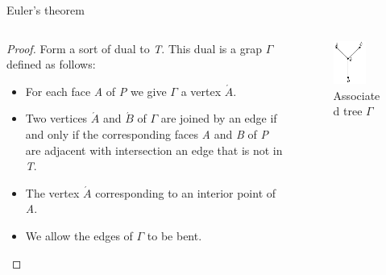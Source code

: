 \documentclass{beamer}
\begin{document}
\begin{frame}{Euler's theorem}
\begin{columns}
\begin{column}{0.6\textwidth}
  \begin{proof}
    Form a sort of dual to \textsl{T}. This dual is a grap $\Gamma$ defined as follows:
    \begin{itemize}
    \item For each face \textsl{A} of \textsl{P} we give $\Gamma$ a vertex $\acute{A}$.
    \item Two vertices $\acute{A}$ and $\acute{B}$ of $\Gamma$ are joined by an edge if and only if the corresponding faces \textsl{A} and \textsl{B} of \textsl{P} are adjacent with intersection an edge that is not in \textsl{T}.
    \item The vertex $\acute{A}$ corresponding to an interior point of \textsl{A}.
    \item We allow the edges of $\Gamma$ to be bent.
    \end{itemize}
  \end{proof}
\end{column}
\begin{column}{0.4\textwidth}
    \begin{figure}
    \centering
        \includegraphics[width=0.7\textwidth]{figure_1_5_b.png}
        \caption{Associated tree $\Gamma$}
    \end{figure}
\end{column}
\end{columns}
\end{frame}
\end{document}
